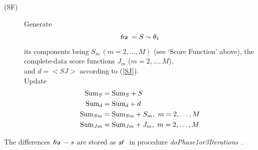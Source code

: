 \documentclass[a4paper,12pt,fleqn]{article}
\newcommand{\nnm}[1]{\textsf{\small\textit{#1}\ }}
\begin{document}
\begin{enumerate}
\begin{description}
      \item[(SF)] Generate
           \[
           \nnm{fra} = S \sim \theta_1  \\
           \]
               its components being $S_m \, (m = 2, \ldots, M)$
               (see `Score Function' above),
               the complete-data score functions
               $J_{m}$ ($m = 2, \ldots, M$),\\
               and $d = <\!SJ\!>$ according to (\ref{SJ}).\\
               Update
               \begin{align*}
               {\rm{Sum}}_{S}  &= {\rm{Sum}}_{S} + S \\
               {\rm{Sum}}_{d}  &= {\rm{Sum}}_{d} + d \\
               {\rm{Sum}}_{Sm}  &= {\rm{Sum}}_{Sm} + S_m, \ m = 2, \ldots, M \\
               {\rm{Sum}}_{Jm}  &= {\rm{Sum}}_{Jm} + J_m, \ m = 2, \ldots, M \\
               \end{align*}
     \end{description}

     The differences $\nnm{fra} - s$ are stored as $\nnm{sf}$ in procedure
     \nnm{doPhase1or3Iterations}.


\end{enumerate}
\end{document}
